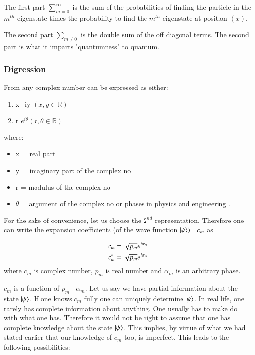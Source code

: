 The first part $\sum_{m=0}^{\infty }$ is the sum of the probabilities of finding the particle in the $m^{th}$ eigenstate times the probability to find the  $m^{th}$ eigenstate at position $(x)$.


The second part $\sum _{m\neq 0}$ is the double sum of the off diagonal terms.
The second part is what it imparts "quantumness" to quantum.
\subsubsection{Digression}
From \cite{churchill1990complex} any complex number can be expressed as either:
\begin{enumerate}
\item x+i{y} $ ( x, y \in \mathds{R})$ 
\item r $e^{i\theta} ( r, \theta \in \mathds{R})$
\end{enumerate}
where: 
\begin{itemize}
\item x = real part
\item y = imaginary part of the complex no 
\item r = modulus of the complex no 
\item $\theta$ = argument  of the complex no or phases in physics and engineering . 
\end{itemize}

For the sake of convenience, let us choose the $2^{nd}$ representation. Therefore one can write the expansion coefficients (of the wave function $\ket{\psi}) \quad c_{m}$ as

\begin{align}\label{eq:27.1}
{ c }_{ m } &=\sqrt { { p }_{m}}{ e }^{ i{ \alpha  }_{ m } }\notag\\
{ c }_{ m }^{*} &=\sqrt { { p }_{m}}{ e }^{ i{ \alpha  }_{ m } }
\end{align}
where ${ c}_{ m }$ is complex number, ${ { p }_{ m } }$ is real number and ${ \alpha  }_{ m }$ is an arbitrary phase. 
\par
${c}_{m}$ is a function of ${{p}_{m}}$ , ${\alpha}_{m}$. Let us say we have partial information about the state $\ket{\psi}$. If one knows ${c}_{m}$ fully one can uniquely determine $\ket{\psi}$. In real life, one rarely has complete information about anything. One usually has to make do with what one has.
Therefore it would not be right to assume that one has complete knowledge about the state $\ket{\psi}$. This implies, by virtue of what we had stated earlier that our knowledge of $c_{m}$ too, is imperfect. This leads to the following possibilities: 

